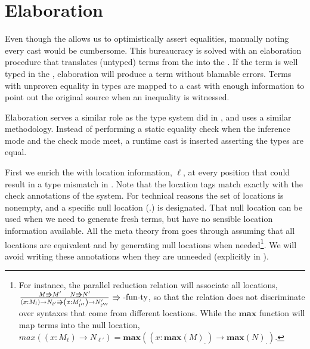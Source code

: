 \section{Elaboration}


Even though the \clang{} allows us to optimistically assert equalities, manually noting every cast would be cumbersome.
This bureaucracy is solved with an elaboration procedure that translates (untyped) terms from the \slang{} into the \clang{}.
If the term is well typed in the \slang{}, elaboration will produce a term without blamable errors.
Terms with unproven equality in types are mapped to a cast with enough information to point out the original source when an inequality is witnessed.
 
Elaboration serves a similar role as the \bidir{} type system did in , and uses a similar methodology.
Instead of performing a static equality check when the inference mode and the check mode meet, a runtime cast is inserted asserting the types are equal.

First we enrich the \slang{} with location information, $\ell$, at every position that could result in a type mismatch in .
Note that the location tags match exactly with the check annotations of the \bidir{} system.
For technical reasons the set of locations is nonempty, and a specific null location ($.$) is designated.
That null location can be used when we need to generate fresh terms, but have no sensible location information available.
All the meta theory from  goes through assuming that all locations are equivalent and by generating null locations when needed\footnote{
  For instance, the parallel reduction relation will associate all locations,
    $\frac{M\Rrightarrow M'\quad N\Rrightarrow N'}{\left(x:M_{l}\right)\rightarrow N_{l'}\Rrightarrow\left(x:M'_{l''}\right)\rightarrow N'_{l'''}}\,\operatorname{\Rrightarrow-fun-ty}$,
    so that the relation does not discriminate over syntaxes that come from different locations.
  While the $\textbf{max}$ function will map terms into the null location,
    $max\left(\left(x:M_{\ell}\right)\rightarrow N_{\ell'}\right)=\textbf{max}\left(\left(x:\textbf{max}\left(M\right)_{.}\right)\rightarrow \textbf{max}\left(N\right)_{.}\right)$.
}.
We will avoid writing these annotations when they are unneeded (explicitly in ).

